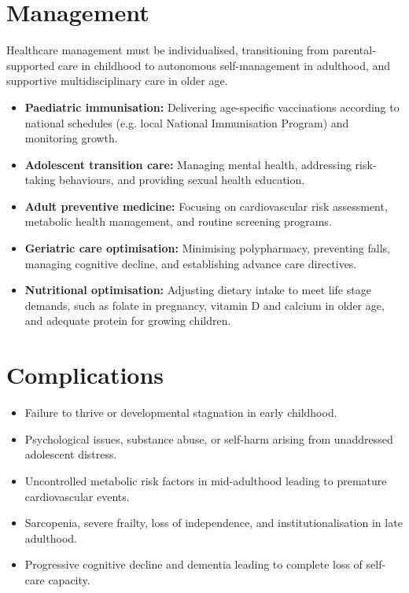 \section*{Management}
Healthcare management must be individualised, transitioning from parental-supported care in childhood to autonomous self-management in adulthood, and supportive multidisciplinary care in older age.
\begin{itemize}
    \item \textbf{Paediatric immunisation:} Delivering age-specific vaccinations according to national schedules (e.g. local National Immunisation Program) and monitoring growth.
    \item \textbf{Adolescent transition care:} Managing mental health, addressing risk-taking behaviours, and providing sexual health education.
    \item \textbf{Adult preventive medicine:} Focusing on cardiovascular risk assessment, metabolic health management, and routine screening programs.
    \item \textbf{Geriatric care optimisation:} Minimising polypharmacy, preventing falls, managing cognitive decline, and establishing advance care directives.
    \item \textbf{Nutritional optimisation:} Adjusting dietary intake to meet life stage demands, such as folate in pregnancy, vitamin D and calcium in older age, and adequate protein for growing children.
\end{itemize}

\section*{Complications}
\begin{itemize}
    \item Failure to thrive or developmental stagnation in early childhood.
    \item Psychological issues, substance abuse, or self-harm arising from unaddressed adolescent distress.
    \item Uncontrolled metabolic risk factors in mid-adulthood leading to premature cardiovascular events.
    \item Sarcopenia, severe frailty, loss of independence, and institutionalisation in late adulthood.
    \item Progressive cognitive decline and dementia leading to complete loss of self-care capacity.
\end{itemize}

